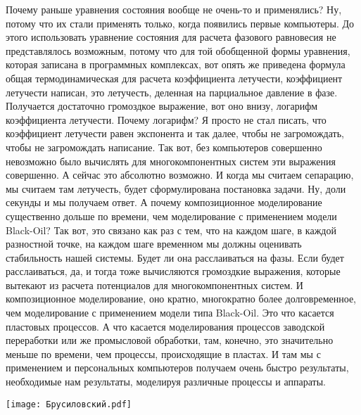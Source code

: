 \documentclass[main.tex]{subfiles}
\begin{document}
Почему раньше уравнения состояния вообще не очень-то и применялись?
Ну, потому что их стали применять только, когда появились первые компьютеры.
До этого использовать уравнение состояния для расчета фазового равновесия не представлялось возможным, потому что для той обобщенной формы уравнения, которая записана в программных комплексах, вот опять же приведена формула общая термодинамическая для расчета коэффициента летучести, коэффициент летучести написан, это летучесть, деленная на парциальное давление в фазе.
Получается достаточно громоздкое выражение, вот оно внизу, логарифм коэффициента летучести.
Почему логарифм?
Я просто не стал писать, что коэффициент летучести равен экспонента и так далее, чтобы не загромождать, чтобы не загромождать написание.
Так вот, без компьютеров совершенно невозможно было вычислять для многокомпонентных систем эти выражения совершенно.
А сейчас это абсолютно возможно.
И когда мы считаем сепарацию, мы считаем там летучесть, будет сформулирована постановка задачи.
Ну, доли секунды и мы получаем ответ.
А почему композиционное моделирование существенно дольше по времени, чем моделирование с применением модели Black-Oil?
Так вот, это связано как раз с тем, что на каждом шаге, в каждой разностной точке, на каждом шаге временном мы должны оценивать стабильность нашей системы.
Будет ли она расслаиваться на фазы.
Если будет расслаиваться, да, и тогда тоже вычисляются громоздкие выражения, которые вытекают из расчета потенциалов для многокомпонентных систем.
И композиционное моделирование, оно кратно, многократно более долговременное, чем моделирование с применением модели типа Black-Oil.
Это что касается пластовых процессов.
А что касается моделирования процессов заводской переработки или же промысловой обработки, там, конечно, это значительно меньше по времени, чем процессы, происходящие в пластах.
И там мы с применением и персональных компьютеров получаем очень быстро результаты, необходимые нам результаты, моделируя различные процессы и аппараты.

\begin{center}
\texttt{[image: Брусиловский.pdf]}
\end{center}
\end{document}
